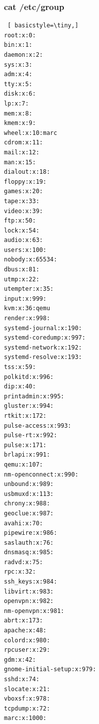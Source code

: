 \documentclass[preprint,11pt]{elsarticle}
\begin{document}
        
\subsubsection{cat /etc/group}
\begin{lstlisting} [ basicstyle=\tiny,]
root:x:0:
bin:x:1:
daemon:x:2:
sys:x:3:
adm:x:4:
tty:x:5:
disk:x:6:
lp:x:7:
mem:x:8:
kmem:x:9:
wheel:x:10:marc
cdrom:x:11:
mail:x:12:
man:x:15:
dialout:x:18:
floppy:x:19:
games:x:20:
tape:x:33:
video:x:39:
ftp:x:50:
lock:x:54:
audio:x:63:
users:x:100:
nobody:x:65534:
dbus:x:81:
utmp:x:22:
utempter:x:35:
input:x:999:
kvm:x:36:qemu
render:x:998:
systemd-journal:x:190:
systemd-coredump:x:997:
systemd-network:x:192:
systemd-resolve:x:193:
tss:x:59:
polkitd:x:996:
dip:x:40:
printadmin:x:995:
gluster:x:994:
rtkit:x:172:
pulse-access:x:993:
pulse-rt:x:992:
pulse:x:171:
brlapi:x:991:
qemu:x:107:
nm-openconnect:x:990:
unbound:x:989:
usbmuxd:x:113:
chrony:x:988:
geoclue:x:987:
avahi:x:70:
pipewire:x:986:
saslauth:x:76:
dnsmasq:x:985:
radvd:x:75:
rpc:x:32:
ssh_keys:x:984:
libvirt:x:983:
openvpn:x:982:
nm-openvpn:x:981:
abrt:x:173:
apache:x:48:
colord:x:980:
rpcuser:x:29:
gdm:x:42:
gnome-initial-setup:x:979:
sshd:x:74:
slocate:x:21:
vboxsf:x:978:
tcpdump:x:72:
marc:x:1000:

\end{lstlisting}
\end{document}
